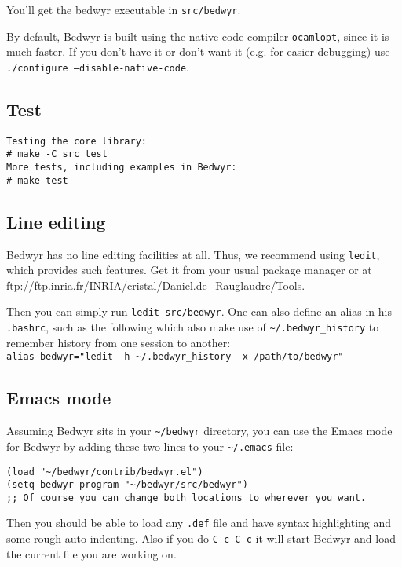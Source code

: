 \documentclass{article}
\begin{document}
You'll get the bedwyr executable in \texttt{src/bedwyr}.

By default, Bedwyr is built using the native-code compiler \texttt{ocamlopt},
since it is much faster. If you don't have it or don't want it (e.g.
for easier debugging) use \texttt{./configure --disable-native-code}.

\subsection{Test}

\begin{verbatim}
Testing the core library:
# make -C src test
More tests, including examples in Bedwyr:
# make test
\end{verbatim}

\subsection{Line editing}

Bedwyr has no line editing facilities at all. Thus, we recommend using 
\texttt{ledit}, which provides such features.
Get it from your usual package manager or at
\url{ftp://ftp.inria.fr/INRIA/cristal/Daniel.de_Rauglaudre/Tools}.

Then you can simply run \texttt{ledit src/bedwyr}. One can also define
an alias in his \verb;.bashrc;, such as the following which also
make use of \verb#~/.bedwyr_history# to remember history from one session to 
another:\\
\verb|alias bedwyr="ledit -h ~/.bedwyr_history -x /path/to/bedwyr"|
 
\subsection{Emacs mode}

Assuming Bedwyr sits in your \verb.~/bedwyr. directory,
you can use the Emacs mode for Bedwyr by adding these two lines to your
\verb,~/.emacs, file:
\begin{verbatim}
(load "~/bedwyr/contrib/bedwyr.el")
(setq bedwyr-program "~/bedwyr/src/bedwyr")
;; Of course you can change both locations to wherever you want.
\end{verbatim}

Then you should be able to load any \verb:.def: file
and have syntax highlighting and some rough auto-indenting.
Also if you do \verb.C-c C-c. it will start Bedwyr
and load the current file you are working on.
\end{document}
